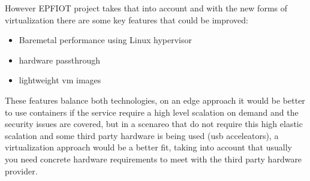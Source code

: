 However EPFIOT project takes that into account and with the new forms of virtualization there are some key features that could be improved:
\begin{itemize}
    \item Baremetal performance using Linux hypervisor
    \item hardware passthrough
    \item lightweight vm images
\end{itemize}

These features balance both technologies, on an edge approach it would be better to use containers if the service require a high level scalation on demand and the security issues are covered, but in a scenareo that do not require this high elastic scalation and some third party hardware is being used (usb acceleators), a virtualization approach would be a better fit, taking into account that usually you need concrete hardware requirements to meet with the third party hardware provider.

\newpage

